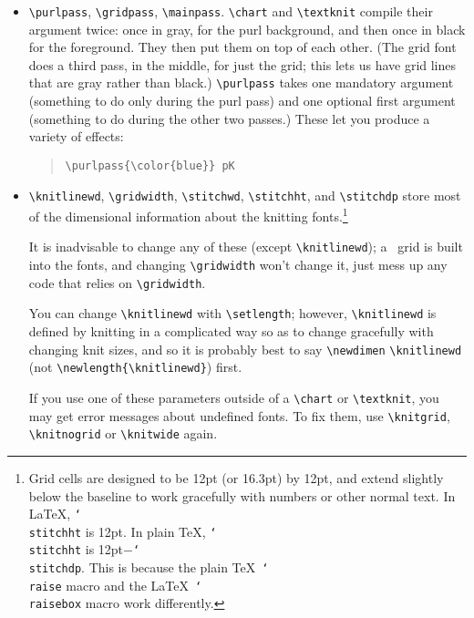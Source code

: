 \documentclass[draft]{amsart}
\begin{document}
\begin{itemize}

\item \verb|\purlpass|, \verb|\gridpass|, \verb|\mainpass|.  \verb|\chart| and \verb|\textknit| compile their argument twice: once in gray, for the purl background, and then once in black for the foreground. They then put them on top of each other. (The grid font does a third pass, in the middle, for just the grid; this lets us have grid lines that are gray rather than black.) \verb|\purlpass| takes one mandatory argument (something to do only during the purl pass) and one optional first argument (something to do during the other two passes.) These let you produce a variety of effects:
\begin{quote}
\verb|\purlpass{\color{blue}} pK| 
\end{quote}

\item \verb|\knitlinewd|, \verb|\gridwidth|, \verb|\stitchwd|, \verb|\stitchht|, and  \verb|\stitchdp| store most of the dimensional information about the knitting fonts.\footnote{Grid cells are designed to be 12pt (or 16.3pt) by 12pt, and extend slightly below the baseline to work gracefully with numbers or other normal text. In \LaTeX, \texttt{\char`\\ stitchht} is 12pt. In plain \TeX, \texttt{\char`\\ stitchht} is 12pt$-$\texttt{\char`\\ stitchdp}. This is because the plain \TeX\ \texttt{\char`\\ raise} macro and the \LaTeX\ \texttt{\char`\\ raisebox} macro work differently.}

It is inadvisable to change any of these (except \verb|\knitlinewd|); a \the\gridwidth\ grid is built into the fonts, and changing \verb|\gridwidth| won't change it, just mess up any code that relies on \verb|\gridwidth|.

You can change \verb|\knitlinewd| with \verb|\setlength|; however, \verb|\knitlinewd| is defined by \textsf{knitting} in a complicated way so as to change gracefully with changing knit sizes, and so it is probably best to say \verb|\newdimen| \verb|\knitlinewd| (not \verb|\newlength|\allowbreak\verb|{\knitlinewd}|) first.

If you use one of these parameters outside of a \verb|\chart| or \verb|\textknit|, you may get error messages about undefined fonts. To fix them, use \verb|\knitgrid|, \verb|\knitnogrid| or \verb|\knitwide| again.


\end{itemize}
\end{document}
